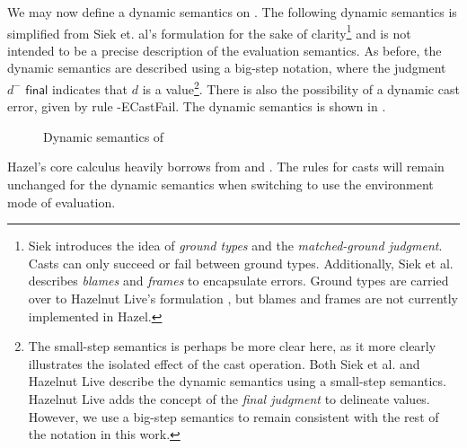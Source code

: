 We may now define a dynamic semantics on \gtclc. The following dynamic semantics is simplified from Siek et. al's formulation for the sake of clarity\footnote{Siek \cite{siek2015refined} introduces the idea of \textit{ground types} and the \textit{matched-ground judgment}. Casts can only succeed or fail between ground types. Additionally, Siek et al. describes \textit{blames} and \textit{frames} to encapsulate errors. Ground types are carried over to Hazelnut Live's formulation \cite{conf/popl/HazelnutLive19}, but blames and frames are not currently implemented in Hazel.} and is not intended to be a precise description of the evaluation semantics. As before, the dynamic semantics are described using a big-step notation, where the judgment $d^-\textsf{ final}$ indicates that $d$ is a value\footnote{The small-step semantics is perhaps be more clear here, as it more clearly illustrates the isolated effect of the cast operation. Both Siek et al. \cite{Siek06gradualtyping,siek2015refined} and Hazelnut Live \cite{conf/popl/HazelnutLive19} describe the dynamic semantics using a small-step semantics. Hazelnut Live adds the concept of the \textit{final judgment} to delineate values. However, we use a big-step semantics to remain consistent with the rest of the notation in this work.}. There is also the possibility of a dynamic cast error, given by rule \gtclc-ECastFail. The dynamic semantics is shown in .

\begin{figure}
  \centering
  \begin{mdframed}
    \begin{singlespace}
    \end{singlespace}
  \end{mdframed}
  \caption{Dynamic semantics of \gtclc}
  \label{fig:dynamics-gtlc}
\end{figure}

Hazel's core calculus heavily borrows from \gtlc{} and \gtclc{}. The rules for casts will remain unchanged for the dynamic semantics when switching to use the environment mode of evaluation.

